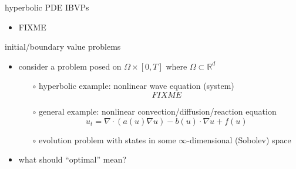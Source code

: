 \documentclass[hide notes,intlimits,usenames,dvipsnames]{beamer}
\newcommand{\RR}{\mathbb{R}}
\newcommand{\Div}{\nabla\cdot}
\newcommand{\grad}{\nabla}
\begin{document}
\begin{frame}{hyperbolic PDE IBVPs}
\begin{itemize}
\item FIXME
\end{itemize}
\end{frame}


\begin{frame}{initial/boundary value problems}

\begin{itemize}
\item consider a problem posed on $\Omega \times [0,T]$ where $\Omega \subset \RR^d$
    \begin{itemize}
    \item[$\circ$] hyperbolic example: nonlinear wave equation (system)
      $$FIXME$$
    \item[$\circ$] general example: nonlinear convection/diffusion/reaction equation
      $$u_t = \Div(a(u) \grad u) - b(u)\cdot \grad u + f(u)$$
    \item[$\circ$] evolution problem with states in some $\infty$-dimensional (Sobolev) space
    \end{itemize}
\item what should ``optimal'' mean?
\end{itemize}
\end{frame}
\end{document}
